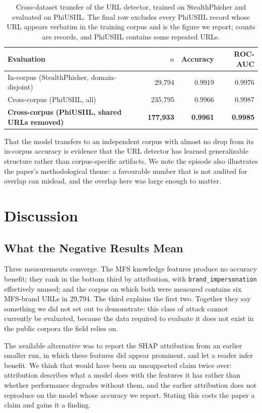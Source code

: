 \documentclass[preprint,12pt,number]{elsarticle}
\begin{document}
\begin{table}[t]
\centering
\caption{Cross-dataset transfer of the URL detector, trained on StealthPhisher and evaluated on PhiUSIIL. The final row excludes every PhiUSIIL record whose URL appears verbatim in the training corpus and is the figure we report; counts are records, and PhiUSIIL contains some repeated URLs.}
\label{tab:transfer}
\small
\begin{tabular}{lrrr}
\toprule
Evaluation & $n$ & Accuracy & ROC-AUC \\
\midrule
In-corpus (StealthPhisher, domain-disjoint) & 29{,}794 & 0.9919 & 0.9976 \\
Cross-corpus (PhiUSIIL, all) & 235{,}795 & 0.9966 & 0.9987 \\
\textbf{Cross-corpus (PhiUSIIL, shared URLs removed)} & \textbf{177{,}933} & \textbf{0.9961} & \textbf{0.9985} \\
\bottomrule
\end{tabular}
\end{table}

That the model transfers to an independent corpus with almost no drop from its in-corpus accuracy is evidence that the URL detector has learned generalizable structure rather than corpus-specific artifacts. We note the episode also illustrates the paper's methodological theme: a favourable number that is not audited for overlap can mislead, and the overlap here was large enough to matter.

\section{Discussion}
\subsection{What the Negative Results Mean}
Three measurements converge. The MFS knowledge features produce no accuracy benefit; they rank in the bottom third by attribution, with \texttt{brand\_impersonation} effectively unused; and the corpus on which both were measured contains six MFS-brand URLs in 29{,}794. The third explains the first two. Together they say something we did not set out to demonstrate: this class of attack cannot currently be evaluated, because the data required to evaluate it does not exist in the public corpora the field relies on.

The available alternative was to report the SHAP attribution from an earlier smaller run, in which these features did appear prominent, and let a reader infer benefit. We think that would have been an unsupported claim twice over: attribution describes what a model does with the features it has rather than whether performance degrades without them, and the earlier attribution does not reproduce on the model whose accuracy we report. Stating this costs the paper a claim and gains it a finding.
\end{document}
